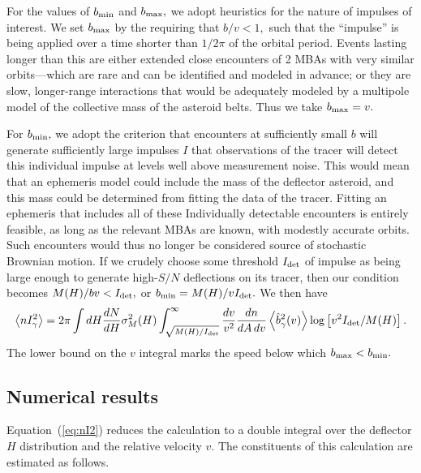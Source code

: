 \documentclass[linenumbers, onecolumn]{aastex631}
\newcommand{\eqq}[1]{Equation~(\ref{#1})}
\begin{document}
For the values of $b_{\rm min}$ and $b_{\rm max},$ we adopt heuristics
for the nature of impulses of interest.  We set $b_{\rm max}$ by the
requiring that $b/v<1,$ such that the ``impulse'' is being applied
over a time shorter than $1/2\pi$ of the orbital period.  Events
lasting longer than this are either extended close encounters of 2
MBAs with very similar orbits---which are rare and can be identified
and modeled in advance; or they are slow, longer-range interactions
that would be adequately modeled by a multipole model of the
collective mass of the asteroid belts.  Thus we take $b_{\rm max}=v.$

For $b_{\rm min},$ we adopt the criterion that encounters at
sufficiently small $b$ will generate sufficiently large impulses $I$
that observations of the tracer will detect this individual impulse at
levels well above measurement noise.  This would mean that an
ephemeris model could include the mass of the deflector asteroid, and
this mass could be determined from fitting the data of the tracer.
Fitting an ephemeris that includes all of these Individually
detectable encounters is entirely feasible, as long as the relevant
MBAs are known, with modestly accurate orbits.
Such encounters would thus no longer be considered source of
stochastic Brownian motion.  If we crudely choose some threshold
$I_{\rm det}$ of impulse as being large enough to generate high-$S/N$
deflections on its tracer, then our condition becomes $M(H)/bv <
I_{\rm det},$ or $b_{\rm min}=M(H)/vI_{\rm det}.$  We then have
\begin{equation}
   \left\langle n I_\gamma^2 \right\rangle = 
2\pi \int dH \frac{dN}{dH} \sigma^2_M(H)  \int_{\sqrt{M(H)/I_{\rm
      det}}}^\infty \frac{dv}{v^2} 
        \frac{dn}{dA\,dv}  \left\langle\hat b_\gamma^2(v)\right\rangle
        \log \left[v^2 I_{\rm det}/M(H)\right].
        \label{eq:nI2}
      \end{equation}
The lower bound on the $v$ integral marks the speed below which
$b_{\rm max}<b_{\rm min}.$

\subsection{Numerical results}
\eqq{eq:nI2} reduces the calculation to a double integral over the
deflector $H$ distribution and the relative velocity $v.$  The
constituents of this calculation are estimated as follows.
\end{document}
